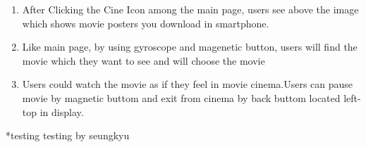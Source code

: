 \documentclass[12pt]{article}
\begin{document}
\begin{enumerate}
\item After Clicking the Cine Icon among the main page, users see above the image which shows movie posters you download in smartphone.   
\item Like main page, by using gyroscope and magenetic button, users will find the movie which they want to see and will choose the movie
\item Users could watch the movie as if they feel in movie cinema.Users can pause movie by magnetic buttom and exit from cinema by back buttom located left-top in display.
\end{enumerate}

*testing testing by seungkyu
\end{document}
